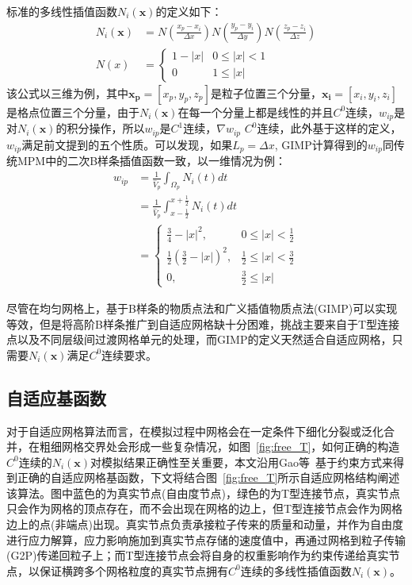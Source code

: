 标准的多线性插值函数$N_i(\mathbf{x})$的定义如下：
\begin{equation}
    \begin{aligned}
        N_i(\mathbf{x}) &= 
                N(\frac{x_p-x_i}{\Delta x})
                N(\frac{y_p-y_i}{\Delta y})
                N(\frac{z_p-z_i}{\Delta z})\\
        N(x) &=
            \begin{cases}
            1 - |x| & 0\leq |x|<1 \\
            0 & 1\leq |x|
            \end{cases}
    \end{aligned}
\end{equation}
该公式以三维为例，其中$\mathbf{x_p}=[x_p,y_p,z_p]$是粒子位置三个分量，$\mathbf{x_i}=[x_i,y_i,z_i]$是格点位置三个分量，由于$N_i(\mathbf{x})$在每一个分量上都是线性的并且$C^0$连续，$w_{ip}$是对$N_i(\mathbf{x})$的积分操作，所以$w_{ip}$是$C^1$连续，$\nabla w_{ip}$ $C^0$连续，此外基于这样的定义，$w_{ip}$满足前文提到的五个性质。可以发现，如果$L_p=\Delta x$, GIMP计算得到的$w_{ip}$同传统MPM中的二次B样条插值函数一致，以一维情况为例：
\begin{equation}
    \begin{aligned}
        w_{ip} &= \frac{1}{\hat{V}_p} \int_{\Omega_p} N_i(t) dt\\
&= \frac{1}{\hat{V}_p} \int_{x - \frac{1}{2}}^{x + \frac{1}{2}} N_i(t) dt\\
&= 
\begin{cases}
\frac{3}{4}-|x|^2, & 0 \leq |x| <\frac{1}{2}\\
\frac{1}{2}(\frac{3}{2}-|x|)^2, & \frac{1}{2}\leq |x|<\frac{3}{2}\\
0, & \frac{3}{2}\leq |x|
\end{cases}
    \end{aligned}
\end{equation}

尽管在均匀网格上，基于B样条的物质点法和广义插值物质点法(GIMP)可以实现等效，但是将高阶B样条推广到自适应网格缺十分困难，挑战主要来自于T型连接点以及不同层级间过渡网格单元的处理，而GIMP的定义天然适合自适应网格，只需要$N_i(\mathbf{x})$满足$C^0$连续要求。

\subsection{自适应基函数}
对于自适应网格算法而言，在模拟过程中网格会在一定条件下细化分裂或泛化合并，在粗细网格交界处会形成一些复杂情况，如图~\ref{fig:free_T}，如何正确的构造$C^0$连续的$N_i(\mathbf{x})$对模拟结果正确性至关重要，本文沿用Gao等~\cite{gao2017adaptive}基于约束方式来得到正确的自适应网格基函数，下文将结合图~\ref{fig:free_T}所示自适应网格结构阐述该算法。图中蓝色的为真实节点(自由度节点)，绿色的为T型连接节点，真实节点只会作为网格的顶点存在，而不会出现在网格的边上，但T型连接节点会作为网格边上的点(非端点)出现。真实节点负责承接粒子传来的质量和动量，并作为自由度进行应力解算，应力影响施加到真实节点存储的速度值中，再通过网格到粒子传输(G2P)传递回粒子上；而T型连接节点会将自身的权重影响作为约束传递给真实节点，以保证横跨多个网格粒度的真实节点拥有$C^0$连续的多线性插值函数$N_i(\mathbf{x})$。

